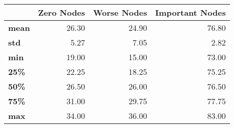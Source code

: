 \begin{tabular}{lrrr}
\toprule
{} &  Zero Nodes &  Worse Nodes &  Important Nodes \\
\midrule
\textbf{mean} &       26.30 &        24.90 &            76.80 \\
\textbf{std } &        5.27 &         7.05 &             2.82 \\
\textbf{min } &       19.00 &        15.00 &            73.00 \\
\textbf{25\% } &       22.25 &        18.25 &            75.25 \\
\textbf{50\% } &       26.50 &        26.00 &            76.50 \\
\textbf{75\% } &       31.00 &        29.75 &            77.75 \\
\textbf{max } &       34.00 &        36.00 &            83.00 \\
\bottomrule
\end{tabular}
